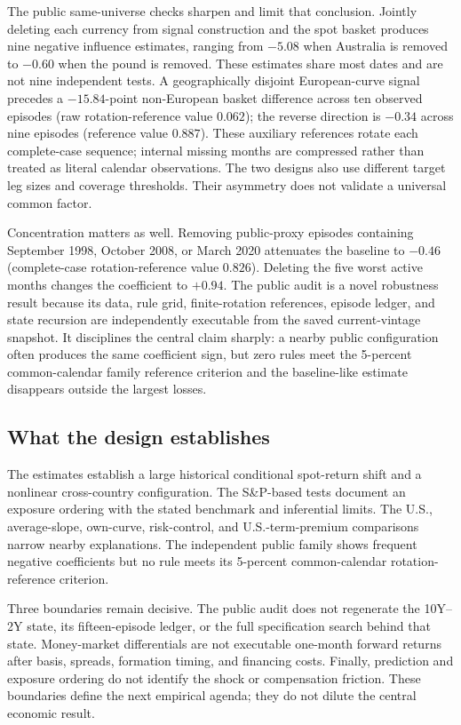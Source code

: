

The public same-universe checks sharpen and limit that conclusion. Jointly deleting each currency from signal construction and the spot basket produces nine negative influence estimates, ranging from $-5.08$ when Australia is removed to $-0.60$ when the pound is removed. These estimates share most dates and are not nine independent tests. A geographically disjoint European-curve signal precedes a $-15.84$-point non-European basket difference across ten observed episodes (raw rotation-reference value $0.062$); the reverse direction is $-0.34$ across nine episodes (reference value $0.887$). These auxiliary references rotate each complete-case sequence; internal missing months are compressed rather than treated as literal calendar observations. The two designs also use different target leg sizes and coverage thresholds. Their asymmetry does not validate a universal common factor.

Concentration matters as well. Removing public-proxy episodes containing September 1998, October 2008, or March 2020 attenuates the baseline to $-0.46$ (complete-case rotation-reference value $0.826$). Deleting the five worst active months changes the coefficient to $+0.94$. The public audit is a novel robustness result because its data, rule grid, finite-rotation references, episode ledger, and state recursion are independently executable from the saved current-vintage snapshot. It disciplines the central claim sharply: a nearby public configuration often produces the same coefficient sign, but zero rules meet the 5-percent common-calendar family reference criterion and the baseline-like estimate disappears outside the largest losses.

\subsection{What the design establishes}

The estimates establish a large historical conditional spot-return shift and a nonlinear cross-country configuration. The S\&P-based tests document an exposure ordering with the stated benchmark and inferential limits. The U.S., average-slope, own-curve, risk-control, and U.S.-term-premium comparisons narrow nearby explanations. The independent public family shows frequent negative coefficients but no rule meets its 5-percent common-calendar rotation-reference criterion.

Three boundaries remain decisive. The public audit does not regenerate the 10Y--2Y state, its fifteen-episode ledger, or the full specification search behind that state. Money-market differentials are not executable one-month forward returns after basis, spreads, formation timing, and financing costs. Finally, prediction and exposure ordering do not identify the shock or compensation friction. These boundaries define the next empirical agenda; they do not dilute the central economic result.
